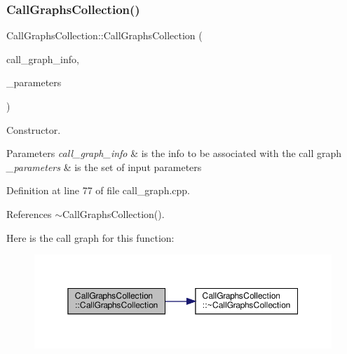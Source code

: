 \subsubsection{\texorpdfstring{Call\+Graphs\+Collection()}{CallGraphsCollection()}}
{\footnotesize\ttfamily Call\+Graphs\+Collection\+::\+Call\+Graphs\+Collection (\begin{DoxyParamCaption}\item[{const \hyperlink{call__graph_8hpp_a3259d849c69d9d111ec0c5178d9b32af}{Call\+Graph\+Info\+Ref}}]{call\+\_\+graph\+\_\+info,  }\item[{const \hyperlink{Parameter_8hpp_a37841774a6fcb479b597fdf8955eb4ea}{Parameter\+Const\+Ref}}]{\+\_\+parameters }\end{DoxyParamCaption})}



Constructor. 


\begin{DoxyParams}{Parameters}
{\em call\+\_\+graph\+\_\+info} & is the info to be associated with the call graph \\
\hline
{\em \+\_\+parameters} & is the set of input parameters \\
\hline
\end{DoxyParams}


Definition at line 77 of file call\+\_\+graph.\+cpp.



References $\sim$\+Call\+Graphs\+Collection().

Here is the call graph for this function\+:
\nopagebreak
\begin{figure}[H]
\begin{center}
\leavevmode
\includegraphics[width=350pt]{d2/d82/classCallGraphsCollection_aadb82660b67e7b7821cc4b0418786f5d_cgraph}
\end{center}
\end{figure}
\mbox{\label{classCallGraphsCollection_af8cacb85b589000d5ad2aa5f0a804489}} 
